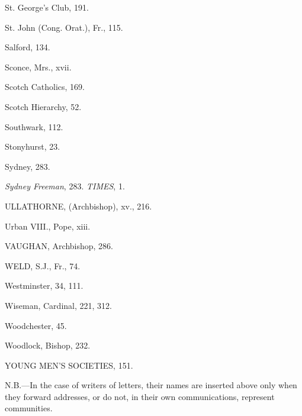 St. George's Club, 191.

St. John (Cong. Orat.), Fr., 115.

Salford, 134.

Sconce, Mrs., xvii.

Scotch Catholics, 169.

Scotch Hierarchy, 52.

Southwark, 112.

Stonyhurst, 23.

Sydney, 283.

\emph{Sydney Freeman}, 283.
\emph{TIMES}, 1.

ULLATHORNE, (Archbishop), xv., 216.

Urban VIII., Pope, xiii.

VAUGHAN, Archbishop, 286.

WELD, S.J., Fr., 74.

Westminster, 34, 111.

Wiseman, Cardinal, 221, 312.

Woodchester, 45.

Woodlock, Bishop, 232.

YOUNG MEN'S SOCIETIES,
151.

N.B.—In the case of writers of letters, their names are inserted
above only when they forward addresses, or do not, in their own
communications, represent communities.

